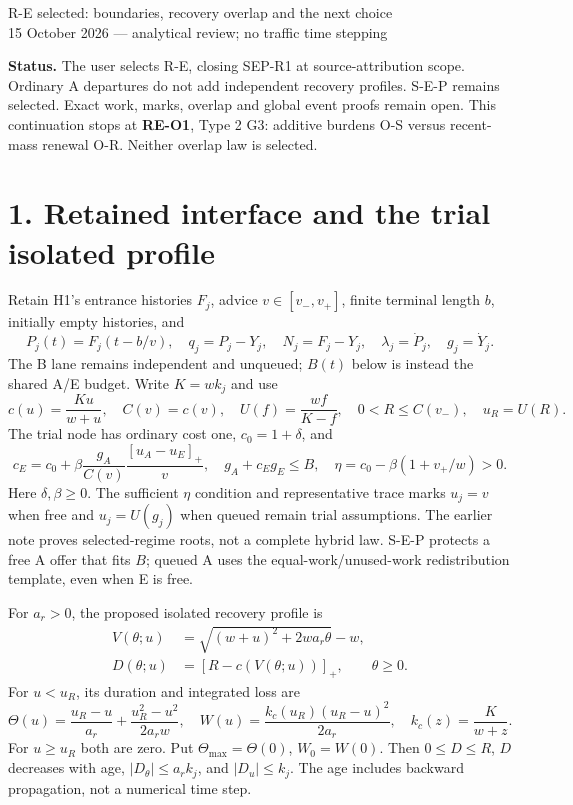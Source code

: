 \documentclass[11pt,a4paper]{article}
\newcommand{\pos}[1]{[#1]_+}
\begin{document}
\begin{center}
{\Large R-E selected: boundaries, recovery overlap and the next choice}\\[4pt]
15 October 2026 --- analytical review; no traffic time stepping
\end{center}

\textbf{Status.} The user selects R-E, closing SEP-R1 at source-attribution
scope. Ordinary A departures do not add independent recovery profiles.
S-E-P remains selected. Exact work, marks, overlap and global event proofs
remain open. This continuation stops at \textbf{RE-O1}, Type 2 G3: additive
burdens O-S versus recent-mass renewal O-R. Neither overlap law is selected.

\section*{1. Retained interface and the trial isolated profile}

Retain H1's entrance histories $F_j$, advice $v\in[v_-,v_+]$, finite
terminal length $b$, initially empty histories, and
\begin{equation}
 P_j(t)=F_j(t-b/v),\quad q_j=P_j-Y_j,\quad N_j=F_j-Y_j,
 \quad \lambda_j=\dot P_j,\quad g_j=\dot Y_j. \tag{1}
\end{equation}
The B lane remains independent and unqueued; $B(t)$ below is instead the
shared A/E budget. Write $K=wk_j$ and use
\begin{equation}
 c(u)=\frac{Ku}{w+u},\quad C(v)=c(v),\quad
 U(f)=\frac{wf}{K-f},\quad 0<R\leq C(v_-),\quad u_R=U(R). \tag{2}
\end{equation}
The trial node has ordinary cost one, $c_0=1+\delta$, and
\begin{equation}
 c_E=c_0+\beta\frac{g_A}{C(v)}\frac{\pos{u_A-u_E}}v,
 \quad g_A+c_Eg_E\leq B,\quad
 \eta=c_0-\beta(1+v_+/w)>0. \tag{3}
\end{equation}
Here $\delta,\beta\geq0$. The sufficient $\eta$ condition and representative
trace marks $u_j=v$ when free and $u_j=U(g_j)$ when queued remain trial
assumptions. The earlier note proves selected-regime roots, not a complete
hybrid law. S-E-P protects a free A offer that fits $B$; queued A uses the
equal-work/unused-work redistribution template, even when E is free.

For $a_r>0$, the proposed isolated recovery profile is
\begin{align}
 V(\theta;u)&=\sqrt{(w+u)^2+2wa_r\theta}-w,\nonumber\\
 D(\theta;u)&=\pos{R-c(V(\theta;u))},\qquad \theta\geq0. \tag{4}
\end{align}
For $u<u_R$, its duration and integrated loss are
\begin{equation}
 \Theta(u)=\frac{u_R-u}{a_r}+\frac{u_R^2-u^2}{2a_rw},\quad
 W(u)=\frac{k_c(u_R)(u_R-u)^2}{2a_r},\quad
 k_c(z)=\frac{K}{w+z}. \tag{5}
\end{equation}
For $u\geq u_R$ both are zero. Put $\Theta_{\max}=\Theta(0)$,
$W_0=W(0)$. Then $0\leq D\leq R$, $D$ decreases with age,
$|D_\theta|\leq a_rk_j$, and $|D_u|\leq k_j$.
The age includes backward propagation, not a numerical time step.
\end{document}
